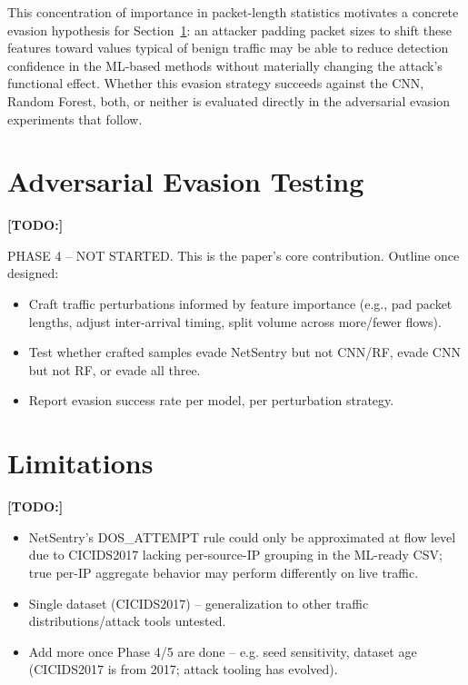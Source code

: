 \documentclass[conference]{IEEEtran}
\newenvironment{todo}
  {\par\noindent\color{red}\bfseries[TODO:]\normalfont\color{red}\begin{itshape}}
  {\end{itshape}\par\normalfont\color{black}}
\begin{document}
This concentration of importance in packet-length statistics motivates a concrete evasion hypothesis for Section~\ref{evasion-section}: an attacker padding packet sizes to shift these features toward values typical of benign traffic may be able to reduce detection confidence in the ML-based methods without materially changing the attack's functional effect. Whether this evasion strategy succeeds against the CNN, Random Forest, both, or neither is evaluated directly in the adversarial evasion experiments that follow.
 
\section{Adversarial Evasion Testing}
\label{evasion-section}
\begin{todo}
PHASE 4 -- NOT STARTED. This is the paper's core contribution. Outline once designed:
\begin{itemize}
\item Craft traffic perturbations informed by feature importance (e.g., pad packet lengths, adjust inter-arrival timing, split volume across more/fewer flows).
\item Test whether crafted samples evade NetSentry but not CNN/RF, evade CNN but not RF, or evade all three.
\item Report evasion success rate per model, per perturbation strategy.
\end{itemize}
\end{todo}
 
\section{Limitations}
\label{limitations-section}
\begin{todo}
\begin{itemize}
\item NetSentry's DOS\_ATTEMPT rule could only be approximated at flow level due to CICIDS2017 lacking per-source-IP grouping in the ML-ready CSV; true per-IP aggregate behavior may perform differently on live traffic.
\item Single dataset (CICIDS2017) -- generalization to other traffic distributions/attack tools untested.
\item Add more once Phase 4/5 are done -- e.g. seed sensitivity, dataset age (CICIDS2017 is from 2017; attack tooling has evolved).
\end{itemize}
\end{todo}
 
\end{document}
